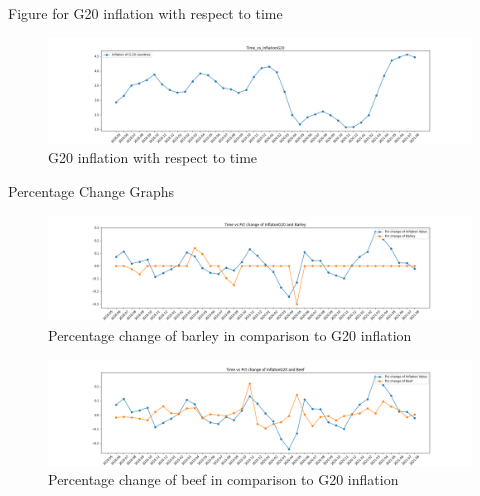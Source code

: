 \begin{frame}{Figure for G20 inflation with respect to time}
  \begin{figure} [H]
	\begin{center}
		\includegraphics[scale=0.2]{images/illustrate/Time_vs_InflationG20.png}
	\end{center}
	\caption{G20 inflation with respect to time}
	\label{fig:log-archi}
\end{figure}

\end{frame}

\begin{frame}{Percentage Change Graphs}
 \begin{figure} [H]
	\begin{center}
		\includegraphics[scale=0.2]{images/illustrate/pct_change_inflation_and_Barley.png}
	\end{center}
	\caption{Percentage change of barley in comparison to G20 inflation }
	\label{fig:log-archi}
\end{figure}

\begin{figure} [H]
	\begin{center}
		\includegraphics[scale=0.2]{images/illustrate/pct_change_inflation_and_Beef.png}
	\end{center}
	\caption{Percentage change of beef in comparison to G20 inflation  }
	\label{fig:log-archi}
\end{figure}
\end{frame}


